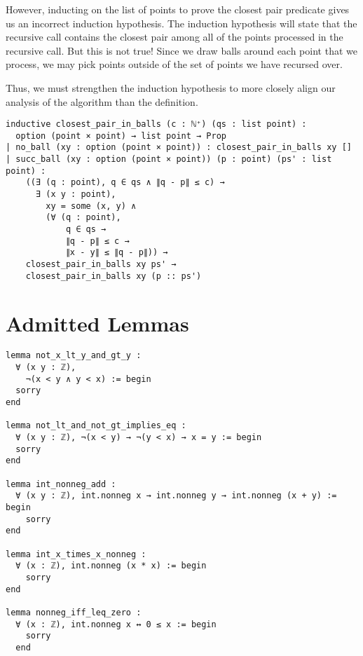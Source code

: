 \documentclass{article}
\begin{document}
However, inducting on the list of points to prove the closest pair predicate gives us an incorrect induction hypothesis.
The induction hypothesis will state that the recursive call contains the closest pair among all of the points processed in the recursive call.
But this is not true!
Since we draw balls around each point that we process, we may pick points outside of the set of points we have recursed over.

Thus, we must strengthen the induction hypothesis to more closely align our analysis of the algorithm than the definition.

\begin{verbatim}
inductive closest_pair_in_balls (c : ℕ⁺) (qs : list point) :
  option (point × point) → list point → Prop
| no_ball (xy : option (point × point)) : closest_pair_in_balls xy []
| succ_ball (xy : option (point × point)) (p : point) (ps' : list point) :
    ((∃ (q : point), q ∈ qs ∧ ∥q - p∥ ≤ c) →
      ∃ (x y : point),
        xy = some (x, y) ∧
        (∀ (q : point),
            q ∈ qs →
            ∥q - p∥ ≤ c →
            ∥x - y∥ ≤ ∥q - p∥)) →
    closest_pair_in_balls xy ps' →
    closest_pair_in_balls xy (p :: ps')
\end{verbatim}

\section{Admitted Lemmas}
\begin{verbatim}
lemma not_x_lt_y_and_gt_y :
  ∀ (x y : ℤ),
    ¬(x < y ∧ y < x) := begin
  sorry
end

lemma not_lt_and_not_gt_implies_eq :
  ∀ (x y : ℤ), ¬(x < y) → ¬(y < x) → x = y := begin
  sorry
end

lemma int_nonneg_add :
  ∀ (x y : ℤ), int.nonneg x → int.nonneg y → int.nonneg (x + y) := begin
    sorry
end

lemma int_x_times_x_nonneg :
  ∀ (x : ℤ), int.nonneg (x * x) := begin
    sorry
end

lemma nonneg_iff_leq_zero :
  ∀ (x : ℤ), int.nonneg x ↔ 0 ≤ x := begin
    sorry
  end
\end{verbatim}
\end{document}
